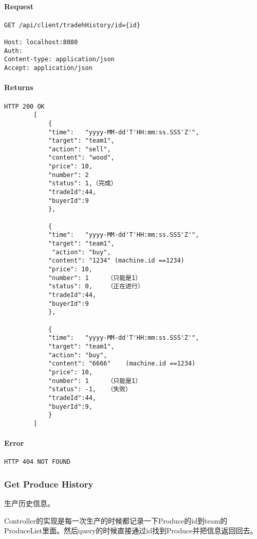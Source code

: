 \documentclass{article}
\begin{document}
					\paragraph*{Request}
\begin{lstlisting}
GET /api/client/tradehHistory/id={id}

Host: localhost:8080
Auth:
Content-type: application/json
Accept: application/json
\end{lstlisting}
					\paragraph*{Returns}
\begin{lstlisting}
HTTP 200 OK
        [
            {
            "time":   "yyyy-MM-dd'T'HH:mm:ss.SSS'Z'",
            "target": "team1",
            "action": "sell",
            "content": "wood",
            "price": 10,
            "number": 2
            "status": 1,（完成）
            "tradeId":44,
            "buyerId":9
            },

            {
            "time":   "yyyy-MM-dd'T'HH:mm:ss.SSS'Z'",
            "target": "team1",
             "action": "buy",
            "content": "1234" (machine.id ==1234)
            "price": 10,
            "number": 1     （只能是1）
            "status": 0,    （正在进行）
            "tradeId":44,
            "buyerId":9
            },

            {
            "time":   "yyyy-MM-dd'T'HH:mm:ss.SSS'Z'",
            "target": "team1",
            "action": "buy",
            "content": "6666"    (machine.id ==1234)
            "price": 10,
            "number": 1     （只能是1）
            "status": -1,   （失败）
            "tradeId":44,
            "buyerId":9,
            }
        ]\end{lstlisting}
					\paragraph*{Error}
\begin{lstlisting}
HTTP 404 NOT FOUND
\end{lstlisting}

				\subsubsection{Get Produce History}
					生产历史信息。

                    Controller的实现是每一次生产的时候都记录一下Produce的id到team的ProduceList里面。然后query的时候直接通过id找到Produce并把信息返回回去。
\end{document}
